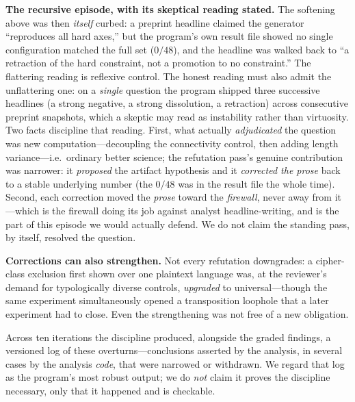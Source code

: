 \documentclass[11pt]{article}
\begin{document}
\textbf{The recursive episode, with its skeptical reading stated.} The softening above was
then \emph{itself} curbed: a preprint headline claimed the generator ``reproduces all hard
axes,'' but the program's own result file showed no single configuration matched the full set
($0/48$), and the headline was walked back to ``a retraction of the hard constraint, not a
promotion to no constraint.'' The flattering reading is reflexive control. The honest reading
must also admit the unflattering one: on a \emph{single} question the program shipped three
successive headlines (a strong negative, a strong dissolution, a retraction) across
consecutive preprint snapshots, which a skeptic may read as instability rather than
virtuosity. Two facts discipline that reading. First, what actually \emph{adjudicated} the
question was new computation---decoupling the connectivity control, then adding length
variance---i.e.\ ordinary better science; the refutation pass's genuine contribution was
narrower: it \emph{proposed} the artifact hypothesis and it \emph{corrected the prose} back to
a stable underlying number (the $0/48$ was in the result file the whole time). Second, each
correction moved the \emph{prose} toward the \emph{firewall}, never away from it---which is
the firewall doing its job against analyst headline-writing, and is the part of this episode
we would actually defend. We do not claim the standing pass, by itself, resolved the question.

\textbf{Corrections can also strengthen.} Not every refutation downgrades: a cipher-class
exclusion first shown over one plaintext language was, at the reviewer's demand for
typologically diverse controls, \emph{upgraded} to universal---though the same experiment
simultaneously opened a transposition loophole that a later experiment had to close. Even the
strengthening was not free of a new obligation.

Across ten iterations the discipline produced, alongside the graded findings, a versioned log
of these overturns---conclusions asserted by the analysis, in several cases by the analysis
\emph{code}, that were narrowed or withdrawn. We regard that log as the program's most robust
output; we do \emph{not} claim it proves the discipline necessary, only that it happened and
is checkable.
\end{document}
